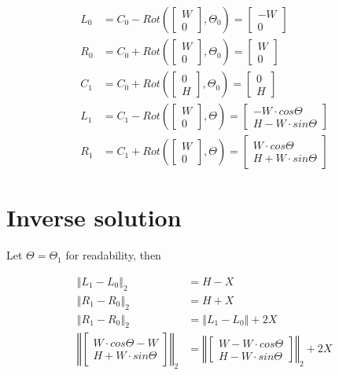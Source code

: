 \documentclass{article}
\begin{document}
\begin{align}
    L_0 &= C_0 - Rot(\begin{bmatrix} W \\ 0 \end{bmatrix}, \Theta_0) = \begin{bmatrix} -W \\ 0 \end{bmatrix} \\
    R_0 &= C_0 + Rot(\begin{bmatrix} W \\ 0 \end{bmatrix}, \Theta_0) = \begin{bmatrix} W \\ 0 \end{bmatrix} \\
    C_1 &= C_0 + Rot(\begin{bmatrix} 0 \\ H \end{bmatrix}, \Theta_0) = \begin{bmatrix} 0 \\ H \end{bmatrix} \\
    L_1 &= C_1 - Rot(\begin{bmatrix} W \\ 0 \end{bmatrix}, \Theta) = \begin{bmatrix} -W\cdot cos\Theta \\ H - W\cdot sin\Theta \end{bmatrix} \\
    R_1 &= C_1 + Rot(\begin{bmatrix} W \\ 0 \end{bmatrix}, \Theta) = \begin{bmatrix} W\cdot cos\Theta \\ H + W\cdot sin\Theta \end{bmatrix}
\end{align}

\section{Inverse solution}

Let $\Theta = \Theta_1$ for readability, then

\begin{align}
    \left\Vert L_1 - L_0 \right\Vert_2 &= H - X \\
    \left\Vert R_1 - R_0 \right\Vert_2 &= H + X \\
    \left\Vert R_1 - R_0 \right\Vert_2 &= \left\Vert L_1 - L_0 \right\Vert + 2X \\
    \left\Vert \begin{bmatrix} W\cdot cos\Theta - W \\ H + W\cdot sin\Theta \end{bmatrix} \right\Vert_2 &= \left\Vert \begin{bmatrix} W - W\cdot cos\Theta \\ H - W\cdot sin\Theta \end{bmatrix} \right\Vert_2 + 2X \nonumber
\end{align}
\end{document}
